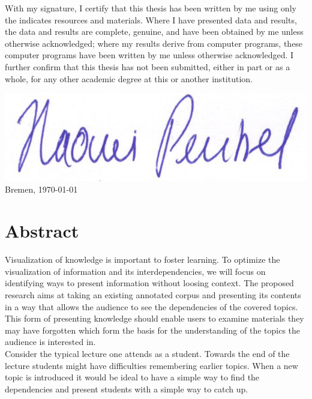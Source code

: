 \documentclass[twoside]{article}
\begin{document}
\newpage
\noindent
  With my signature, I certify that this thesis has been written by me
  using only the indicates resources and materials. Where I have
  presented data and results, the data and results are complete,
  genuine, and have been obtained by me unless otherwise acknowledged;
  where my results derive from computer programs, these computer
  programs have been written by me unless otherwise acknowledged. I
  further confirm that this thesis has not been submitted, either in
  part or as a whole, for any other academic degree at this or another
  institution.

  \vspace{20mm}

    \includegraphics[scale=0.2]{assets/Signature}
 \hfill Bremen, \today
  
\newpage

\thispagestyle{fancy} %


 \section*{Abstract}
 \label{sec:abstract}
Visualization of knowledge is important to foster learning. To optimize the visualization of information and its interdependencies, we will focus on identifying ways to present information without loosing context. The proposed research aims at taking an existing annotated corpus and presenting its contents in a way that allows the audience to see the dependencies of the covered topics. This form of presenting knowledge should enable users to examine materials they may have forgotten which form the basis for the understanding of the topics the audience is interested in.\\

Consider the typical lecture one attends as a student. Towards the end of the lecture students might have difficulties remembering earlier topics. When a new topic is introduced it would be ideal to have a simple way to find the dependencies and present students with a simple way to catch up.\\
\end{document}

